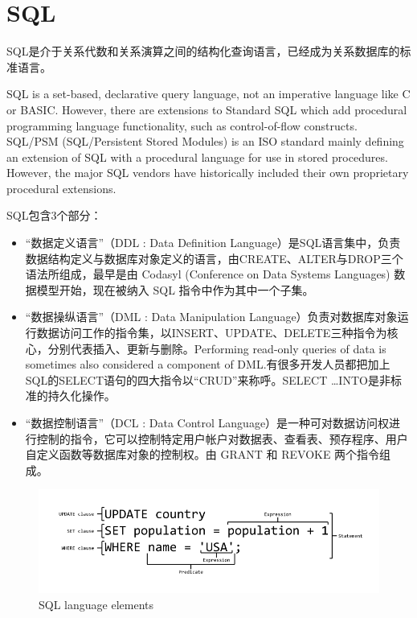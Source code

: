 \section{SQL}
SQL是介于关系代数和关系演算之间的结构化查询语言，已经成为关系数据库的标准语言。


SQL is a set-based, declarative query language, not an imperative language like C or BASIC. However, there are extensions to Standard SQL which add procedural programming language functionality, such as control-of-flow constructs. SQL/PSM (SQL/Persistent Stored Modules) is an ISO standard mainly defining an extension of SQL with a procedural language for use in stored procedures. However, the major SQL vendors have historically included their own proprietary procedural extensions. 

SQL包含3个部分：
\begin{itemize}
    \item 
“数据定义语言”（DDL : Data Definition Language）是SQL语言集中，负责数据结构定义与数据库对象定义的语言，由CREATE、ALTER与DROP三个语法所组成，最早是由 Codasyl (Conference on Data Systems Languages) 数据模型开始，现在被纳入 SQL 指令中作为其中一个子集。
    \item 
“数据操纵语言”（DML : Data Manipulation Language）负责对数据库对象运行数据访问工作的指令集，以INSERT、UPDATE、DELETE三种指令为核心，分别代表插入、更新与删除。Performing read-only queries of data is sometimes also considered a component of DML.有很多开发人员都把加上SQL的SELECT语句的四大指令以“CRUD”来称呼。SELECT \ldots INTO是非标准的持久化操作。
    \item 
“数据控制语言”（DCL : Data Control Language）是一种可对数据访问权进行控制的指令，它可以控制特定用户帐户对数据表、查看表、预存程序、用户自定义函数等数据库对象的控制权。由 GRANT 和 REVOKE 两个指令组成。
\end{itemize}

\begin{figure}[htpb]
    \begin{center}
        \includegraphics[keepaspectratio,width=0.5\paperwidth]{Pictures/SqlANATOMY.png}
    \end{center}
    \caption{SQL language elements}
    \label{fig:SQL lan elem}
\end{figure}

